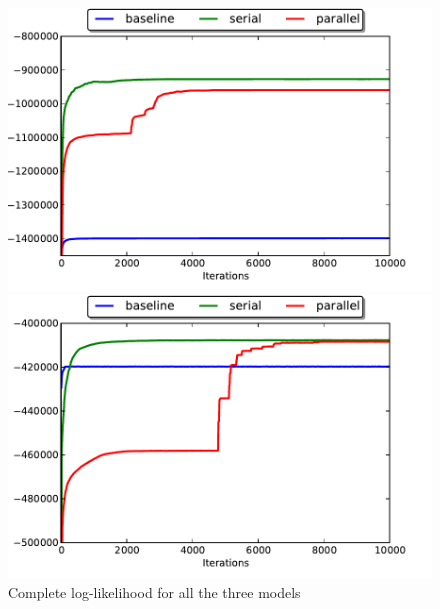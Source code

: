 \begin{figure}[ht]
\begin{minipage}[b]{0.45\linewidth}
\centering
\includegraphics[width=\textwidth]{fig/en_lls}
\end{minipage}
\hspace{0.5cm}
\begin{minipage}[b]{0.45\linewidth}
\centering
\includegraphics[width=\textwidth]{fig/ru_lls}
\end{minipage}
\caption{\label{fig:ll} Complete log-likelihood for all the three models}
\end{figure}


